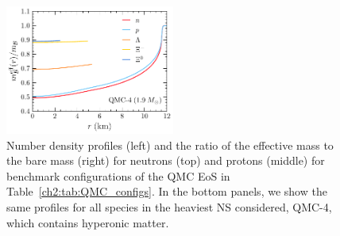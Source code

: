 \begin{figure}[t!bp]
    \includegraphics[width=0.495\textwidth]{meff_B_QMC_profs.pdf}
    \caption{Number density profiles (left) and the ratio of the effective mass to the bare mass (right) for neutrons (top) and protons (middle) for benchmark configurations of the QMC EoS in Table~\ref{ch2:tab:QMC_configs}. In the bottom panels, we show the same profiles for all species in the heaviest NS considered, QMC-4, which contains hyperonic matter.}
    \label{ch2:fig:QMC_profiles}
\end{figure}
